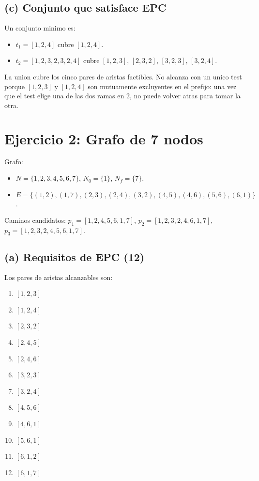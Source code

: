 \documentclass[12pt,a4paper]{article}
\begin{document}
\subsection{(c) Conjunto que satisface EPC}

Un conjunto minimo es:
\begin{itemize}
  \item $t_1 = [1, 2, 4]$ \quad cubre $[1,2,4]$.
  \item $t_2 = [1, 2, 3, 2, 3, 2, 4]$ \quad cubre $[1,2,3]$, $[2,3,2]$, $[3,2,3]$, $[3,2,4]$.
\end{itemize}

La union cubre los cinco pares de aristas factibles. No alcanza con un unico test porque
$[1,2,3]$ y $[1,2,4]$ son mutuamente excluyentes en el prefijo: una vez que el test elige una de
las dos ramas en 2, no puede volver atras para tomar la otra.

\section{Ejercicio 2: Grafo de 7 nodos}

Grafo:
\begin{itemize}
  \item $N = \{1,2,3,4,5,6,7\}$, $N_0 = \{1\}$, $N_f = \{7\}$.
  \item $E = \{(1,2), (1,7), (2,3), (2,4), (3,2), (4,5), (4,6), (5,6), (6,1)\}$.
\end{itemize}

Caminos candidatos: $p_1 = [1,2,4,5,6,1,7]$, $p_2 = [1,2,3,2,4,6,1,7]$,
$p_3 = [1,2,3,2,4,5,6,1,7]$.

\subsection{(a) Requisitos de EPC (12)}

Los pares de aristas alcanzables son:

\begin{enumerate}
  \item $[1,2,3]$
  \item $[1,2,4]$
  \item $[2,3,2]$
  \item $[2,4,5]$
  \item $[2,4,6]$
  \item $[3,2,3]$
  \item $[3,2,4]$
  \item $[4,5,6]$
  \item $[4,6,1]$
  \item $[5,6,1]$
  \item $[6,1,2]$
  \item $[6,1,7]$
\end{enumerate}
\end{document}
